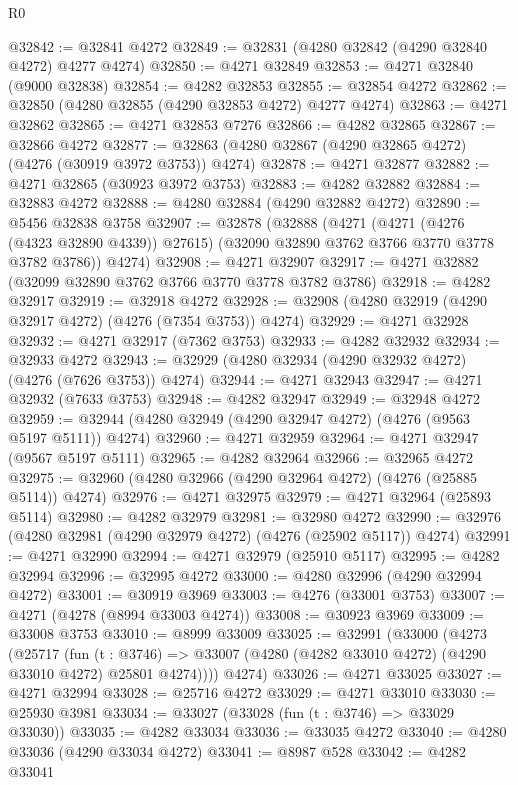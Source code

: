 \begin{lexlean}{R0}
\begin{coremodule}
@32842 := @32841 @4272
@32849 := @32831 (@4280 @32842 (@4290 @32840 @4272) @4277 @4274)
@32850 := @4271 @32849
@32853 := @4271 @32840 (@9000 @32838)
@32854 := @4282 @32853
@32855 := @32854 @4272
@32862 := @32850 (@4280 @32855 (@4290 @32853 @4272) @4277 @4274)
@32863 := @4271 @32862
@32865 := @4271 @32853 @7276
@32866 := @4282 @32865
@32867 := @32866 @4272
@32877 := @32863 (@4280 @32867 (@4290 @32865 @4272) (@4276 (@30919 @3972 @3753)) @4274)
@32878 := @4271 @32877
@32882 := @4271 @32865 (@30923 @3972 @3753)
@32883 := @4282 @32882
@32884 := @32883 @4272
@32888 := @4280 @32884 (@4290 @32882 @4272)
@32890 := @5456 @32838 @3758
@32907 := @32878
    (@32888
      (@4271
        (@4271 (@4276 (@4323 @32890 @4339)) @27615)
        (@32090 @32890 @3762 @3766 @3770 @3778 @3782 @3786))
      @4274)
@32908 := @4271 @32907
@32917 := @4271 @32882 (@32099 @32890 @3762 @3766 @3770 @3778 @3782 @3786)
@32918 := @4282 @32917
@32919 := @32918 @4272
@32928 := @32908 (@4280 @32919 (@4290 @32917 @4272) (@4276 (@7354 @3753)) @4274)
@32929 := @4271 @32928
@32932 := @4271 @32917 (@7362 @3753)
@32933 := @4282 @32932
@32934 := @32933 @4272
@32943 := @32929 (@4280 @32934 (@4290 @32932 @4272) (@4276 (@7626 @3753)) @4274)
@32944 := @4271 @32943
@32947 := @4271 @32932 (@7633 @3753)
@32948 := @4282 @32947
@32949 := @32948 @4272
@32959 := @32944 (@4280 @32949 (@4290 @32947 @4272) (@4276 (@9563 @5197 @5111)) @4274)
@32960 := @4271 @32959
@32964 := @4271 @32947 (@9567 @5197 @5111)
@32965 := @4282 @32964
@32966 := @32965 @4272
@32975 := @32960 (@4280 @32966 (@4290 @32964 @4272) (@4276 (@25885 @5114)) @4274)
@32976 := @4271 @32975
@32979 := @4271 @32964 (@25893 @5114)
@32980 := @4282 @32979
@32981 := @32980 @4272
@32990 := @32976 (@4280 @32981 (@4290 @32979 @4272) (@4276 (@25902 @5117)) @4274)
@32991 := @4271 @32990
@32994 := @4271 @32979 (@25910 @5117)
@32995 := @4282 @32994
@32996 := @32995 @4272
@33000 := @4280 @32996 (@4290 @32994 @4272)
@33001 := @30919 @3969
@33003 := @4276 (@33001 @3753)
@33007 := @4271 (@4278 (@8994 @33003 @4274))
@33008 := @30923 @3969
@33009 := @33008 @3753
@33010 := @8999 @33009
@33025 := @32991
    (@33000
      (@4273
        (@25717
          (fun (t : @3746) =>
          @33007 (@4280 (@4282 @33010 @4272) (@4290 @33010 @4272) @25801 @4274))))
      @4274)
@33026 := @4271 @33025
@33027 := @4271 @32994
@33028 := @25716 @4272
@33029 := @4271 @33010
@33030 := @25930 @3981
@33034 := @33027 (@33028 (fun (t : @3746) => @33029 @33030))
@33035 := @4282 @33034
@33036 := @33035 @4272
@33040 := @4280 @33036 (@4290 @33034 @4272)
@33041 := @8987 @528
@33042 := @4282 @33041

\end{coremodule}
\end{lexlean}
